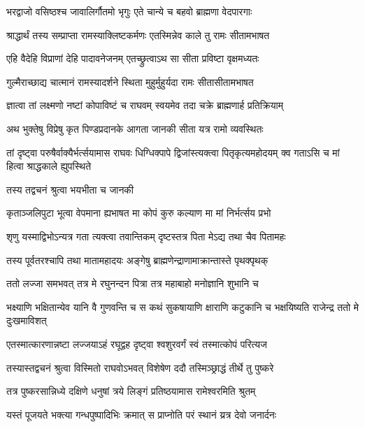 \twolineshloka
{भरद्वाजो वसिष्ठश्च जावालिर्गौतमो भृगुः}
{एते चान्ये च बहवो ब्राह्मणा वेदपारगाः}%

\twolineshloka
{श्राद्धार्थं तस्य सम्प्राप्ता रामस्याक्लिष्टकर्मणः}
{एतस्मिन्नेव काले तु रामः सीतामभाषत}%

\twolineshloka
{एहि वैदेहि विप्राणां देहि पादावनेजनम्}
{एतच्छ्रुत्वाऽथ सा सीता प्रविष्टा वृक्षमध्यतः}%

\twolineshloka
{गुल्मैराच्छाद्य चात्मानं रामस्यादर्शने स्थिता}
{मुहुर्मुहुर्यदा रामः सीतासीतामभाषत}%

\twolineshloka
{ज्ञात्वा तां लक्ष्मणो नष्टां कोपाविष्टं च राघवम्}
{स्वयमेव तदा चक्रे ब्राह्मणार्ह प्रतिक्रियाम्}%

\twolineshloka
{अथ भुक्तेषु विप्रेषु कृत पिण्डप्रदानके}
{आगता जानकी सीता यत्र रामो व्यवस्थितः}%

\threelineshloka
{तां दृष्ट्वा परुषैर्वाक्यैर्भर्त्सयामास राघवः}
{धिग्धिक्पापे द्विजांस्त्यक्त्वा पितृकृत्यमहोदयम्}
{क्व गताऽसि च मां हित्वा श्राद्धकाले ह्युपस्थिते}%


\onelineshloka
{तस्य तद्वचनं श्रुत्वा भयभीता च जानकी}%

\twolineshloka
{कृताञ्जलिपुटा भूत्वा वेपमाना ह्यभाषत}
{मा कोपं कुरु कल्याण मा मां निर्भर्त्सय प्रभो}%

\twolineshloka
{शृणु यस्माद्विभोऽन्यत्र गता त्यक्त्वा तवान्तिकम्}
{दृष्टस्तत्र पिता मेऽद्य तथा चैव पितामहः}%

\twolineshloka
{तस्य पूर्वतरश्चापि तथा मातामहादयः}
{अङ्गेषु ब्राह्मणेन्द्राणामाक्रान्तास्ते पृथक्पृथक्}%

\twolineshloka
{ततो लज्जा समभवत् तत्र मे रघुनन्दन}
{पित्रा तत्र महाबाहो मनोज्ञानि शुभानि च}%

\threelineshloka
{भक्ष्याणि भक्षितान्येव यानि वै गुणवन्ति च}
{स कथं सुकषायाणि क्षाराणि कटुकानि च}
{भक्षयिष्यति राजेन्द्र ततो मे दुःखमाविशत्}%

\twolineshloka
{एतस्मात्कारणान्नष्टा लज्जयाऽहं रघूद्वह}
{दृष्ट्वा श्वशुरवर्गं स्वं तस्मात्कोपं परित्यज}%

\twolineshloka
{तस्यास्तद्वचनं श्रुत्वा विस्मितो राघवोऽभवत्}
{विशेषेण ददौ तस्मिञ्छ्राद्धं तीर्थे तु पुष्करे}%

\twolineshloka
{तत्र पुष्करसान्निध्ये दक्षिणे धनुषां त्रये}
{लिङ्गं प्रतिष्ठयामास रामेश्वरमिति श्रुतम्}%

\twolineshloka
{यस्तं पूजयते भक्त्या गन्धपुष्पादिभिः क्रमात्}
{स प्राप्नोति परं स्थानं य्रत्र देवो जनार्दनः}%

